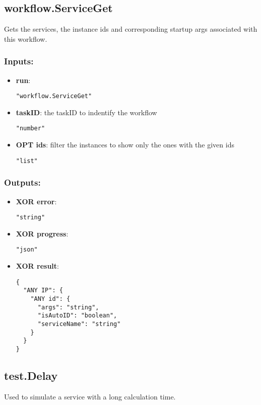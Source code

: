 \subsection{workflow.ServiceGet}
Gets the services, the instance ids and corresponding startup args associated with this workflow.
\subsubsection*{Inputs:}
\begin{itemize}
    \item \textbf{run}: 
\begin{lstlisting}
"workflow.ServiceGet"
\end{lstlisting}
    \item \textbf{taskID}: the taskID to indentify the workflow
\begin{lstlisting}
"number"
\end{lstlisting}
    \item \textbf{OPT ids}: filter the instances to show only the ones with the given ids
\begin{lstlisting}
"list"
\end{lstlisting}
  \end{itemize}

\subsubsection*{Outputs:}
\begin{itemize}
    \item \textbf{XOR error}: 
\begin{lstlisting}
"string"
\end{lstlisting}
    \item \textbf{XOR progress}: 
\begin{lstlisting}
"json"
\end{lstlisting}
    \item \textbf{XOR result}: 
\begin{lstlisting}
{
  "ANY IP": {
    "ANY id": {
      "args": "string", 
      "isAutoID": "boolean", 
      "serviceName": "string"
    }
  }
}
\end{lstlisting}
  \end{itemize}

\subsection{test.Delay}
Used to simulate a service with a long calculation time.
